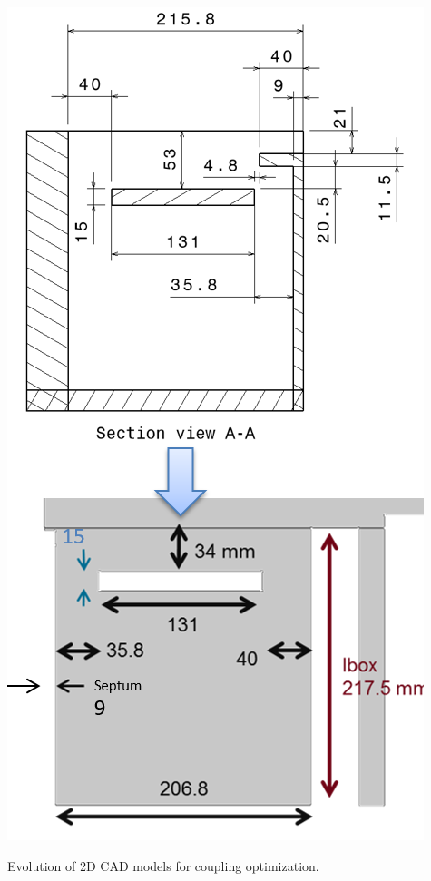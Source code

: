 \begin{marginfigure}
	\centering
	\includegraphics[width=0.8\linewidth]{figures/chap3/WEST_ICRH/WEST_front_face_evolution1}
	\caption{Evolution of 2D CAD models for coupling optimization.}
	\label{fig:westfrontfaceevolution1}
\end{marginfigure}

